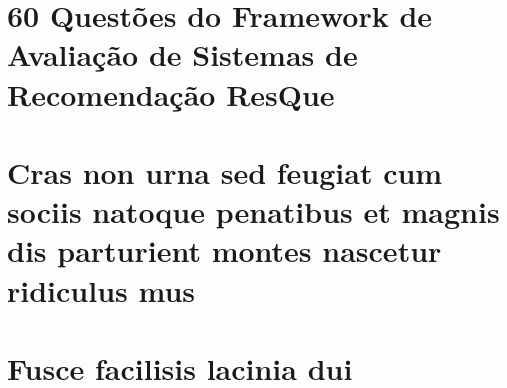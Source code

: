 \chapter{60 Questões do Framework de Avaliação de Sistemas de Recomendação ResQue}\label{ane:questoes-framework}
\lipsum[30]

\chapter{Cras non urna sed feugiat cum sociis natoque penatibus et magnis dis
parturient montes nascetur ridiculus mus}

\lipsum[31]

\chapter{Fusce facilisis lacinia dui}

\lipsum[32]